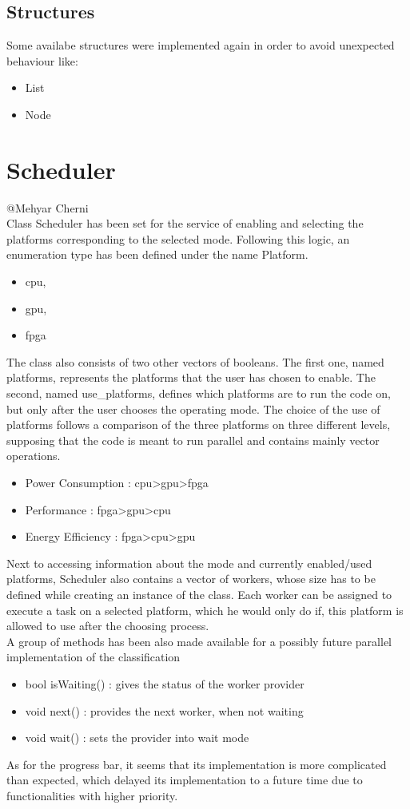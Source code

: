 \documentclass[parskip=full]{scrartcl}
\newcommand\tab[1][1cm]{\hspace*{#1}}
\begin{document}
	\subsection{Structures} \label{Structures}
		\tab Some availabe structures were implemented again in order to avoid unexpected behaviour like:
		\begin{itemize}
			\item List
			\item Node
		\end{itemize} 
		
\pagebreak

\section{Scheduler} \label{Scheduler}
	@Mehyar Cherni\\
	\tab Class Scheduler has been set for the service of enabling and selecting the platforms corresponding to the selected mode. Following this logic, an enumeration type has been defined under the name Platform.
	\begin {itemize}
		\item cpu, 
		\item gpu, 
		\item fpga
	\end{itemize}
	The class also consists of two other vectors of booleans. The first one, named platforms, represents the platforms that the user has chosen to enable. The second, named use\_platforms, defines which platforms are to run the code on, but only after the user chooses the operating mode. The choice of the use of platforms follows a comparison of the three platforms on three different levels, supposing that the code is meant to run parallel and contains mainly vector operations.
	\begin {itemize}
		\item Power Consumption : cpu>gpu>fpga
		\item Performance : fpga>gpu>cpu
		\item Energy Efficiency : fpga>cpu>gpu
	\end{itemize}
Next to accessing information about the mode and currently enabled/used platforms, Scheduler also contains a vector of workers, whose size has to be defined while creating an instance of the class. Each worker can be assigned to execute a task on a selected platform, which he would only do if, this platform is allowed to use after the choosing process. \\A group of methods has been also made available for a possibly future parallel implementation of the classification
	\begin {itemize}
		\item bool isWaiting() : gives the status of the worker provider
		\item void next() : provides the next worker, when not waiting
		\item void wait() : sets the provider into wait mode
	\end{itemize}
As for the progress bar, it seems that its implementation is more complicated than expected, which delayed its implementation to a future time due to functionalities with higher priority.
	
\end{document}
